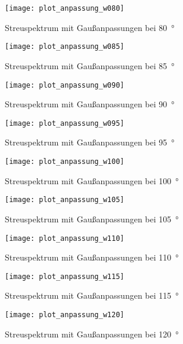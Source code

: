 \documentclass[11pt, ngerman, fleqn, DIV=15, headinclude, BCOR=2cm]{scrreprt}
\begin{document}
\begin{appendix}
\begin{figure}[h]
    \centering
    \texttt{[image: plot\_anpassung\_w080]}
    \caption{%
	    Streuspektrum mit Gaußanpassungen bei \SI{80}{\degree}
    }
    \label{fig:plot_anpassung_w080}
\end{figure}

\begin{figure}[h]
    \centering
    \texttt{[image: plot\_anpassung\_w085]}
    \caption{%
	    Streuspektrum mit Gaußanpassungen bei \SI{85}{\degree}
    }
    \label{fig:plot_anpassung_w085}
\end{figure}

\begin{figure}[h]
    \centering
    \texttt{[image: plot\_anpassung\_w090]}
    \caption{%
	    Streuspektrum mit Gaußanpassungen bei \SI{90}{\degree}
    }
    \label{fig:plot_anpassung_w090}
\end{figure}

\begin{figure}[h]
    \centering
    \texttt{[image: plot\_anpassung\_w095]}
    \caption{%
	    Streuspektrum mit Gaußanpassungen bei \SI{95}{\degree}
    }
    \label{fig:plot_anpassung_w095}
\end{figure}

\begin{figure}[h]
    \centering
    \texttt{[image: plot\_anpassung\_w100]}
    \caption{%
	    Streuspektrum mit Gaußanpassungen bei \SI{100}{\degree}
    }
    \label{fig:plot_anpassung_w100}
\end{figure}

\begin{figure}[h]
    \centering
    \texttt{[image: plot\_anpassung\_w105]}
    \caption{%
	    Streuspektrum mit Gaußanpassungen bei \SI{105}{\degree}
    }
    \label{fig:plot_anpassung_w105}
\end{figure}

\begin{figure}[h]
    \centering
    \texttt{[image: plot\_anpassung\_w110]}
    \caption{%
	    Streuspektrum mit Gaußanpassungen bei \SI{110}{\degree}
    }
    \label{fig:plot_anpassung_w110}
\end{figure}

\begin{figure}[h]
    \centering
    \texttt{[image: plot\_anpassung\_w115]}
    \caption{%
	    Streuspektrum mit Gaußanpassungen bei \SI{115}{\degree}
    }
    \label{fig:plot_anpassung_w115}
\end{figure}

\begin{figure}[h]
    \centering
    \texttt{[image: plot\_anpassung\_w120]}
    \caption{%
	    Streuspektrum mit Gaußanpassungen bei \SI{120}{\degree}
    }
    \label{fig:plot_anpassung_w120}
\end{figure}

\clearpage



\end{appendix}
\end{document}
